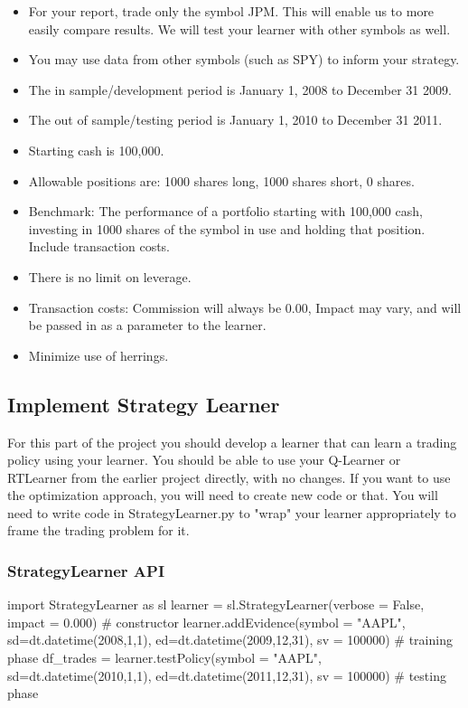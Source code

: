 \documentclass[11pt]{article}
\providecommand{\tightlist}{%
      \setlength{\itemsep}{0pt}\setlength{\parskip}{0pt}}
\begin{document}
\begin{itemize}
\tightlist
\item
  For your report, trade only the symbol JPM. This will enable us to
  more easily compare results. We will test your learner with other
  symbols as well.
\item
  You may use data from other symbols (such as SPY) to inform your
  strategy.
\item
  The in sample/development period is January 1, 2008 to December 31
  2009.
\item
  The out of sample/testing period is January 1, 2010 to December 31
  2011.
\item
  Starting cash is 100,000.
\item
  Allowable positions are: 1000 shares long, 1000 shares short, 0
  shares.
\item
  Benchmark: The performance of a portfolio starting with 100,000 cash,
  investing in 1000 shares of the symbol in use and holding that
  position. Include transaction costs.
\item
  There is no limit on leverage.
\item
  Transaction costs: Commission will always be 0.00, Impact may vary,
  and will be passed in as a parameter to the learner.
\item
  Minimize use of herrings.
\end{itemize}

    \subsection{Implement Strategy
Learner}\label{implement-strategy-learner}

For this part of the project you should develop a learner that can learn
a trading policy using your learner. You should be able to use your
Q-Learner or RTLearner from the earlier project directly, with no
changes. If you want to use the optimization approach, you will need to
create new code or that. You will need to write code in
StrategyLearner.py to "wrap" your learner appropriately to frame the
trading problem for it.

    \subsubsection{StrategyLearner API}\label{strategylearner-api}

import StrategyLearner as sl learner = sl.StrategyLearner(verbose =
False, impact = 0.000) \# constructor learner.addEvidence(symbol =
"AAPL", sd=dt.datetime(2008,1,1), ed=dt.datetime(2009,12,31), sv =
100000) \# training phase df\_trades = learner.testPolicy(symbol =
"AAPL", sd=dt.datetime(2010,1,1), ed=dt.datetime(2011,12,31), sv =
100000) \# testing phase
\end{document}

